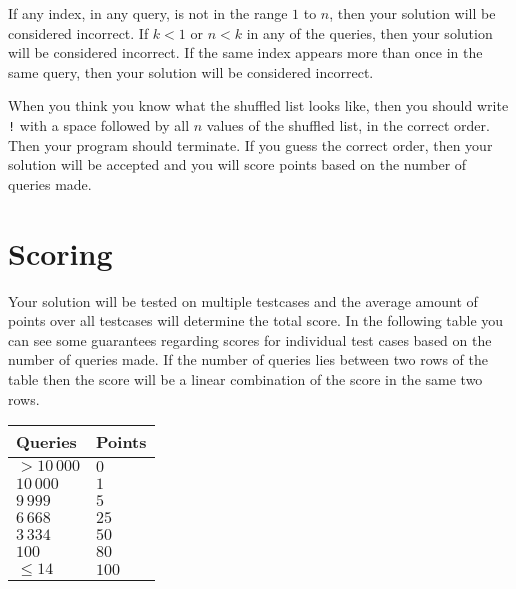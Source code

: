 If any index, in any query, is not in the range $1$ to $n$, then your solution will be considered incorrect.
If $k < 1$ or $n < k$ in any of the queries, then your solution will be considered incorrect.
If the same index appears more than once in the same query, then your solution will be considered incorrect.

When you think you know what the shuffled list looks like, then you should write \texttt{!}
with a space followed by all $n$ values of the shuffled list, in the correct order.
Then your program should terminate.
If you guess the correct order, then your solution will be accepted and you will score points based on
the number of queries made.

\section*{Scoring}
Your solution will be tested on multiple testcases and the average amount of points
over all testcases will determine the total score.
In the following table you can see some guarantees regarding scores for individual test cases based on the number of queries made.
If the number of queries lies between two rows of the table then the score will be a linear combination of the score in the same two rows.

\begin{tabular}{|l|l|}
\hline
Queries & Points   \\ \hline
$> 10\,000$  & $0$     \\ \hline
$10\,000$    & $1$     \\ \hline
$9\,999$     & $5$     \\ \hline
$6\,668$     & $25$    \\ \hline
$3\,334$     & $50$    \\ \hline
$100$      & $80$    \\ \hline
$\leq 14$  & $100$ \\ \hline
\end{tabular}
